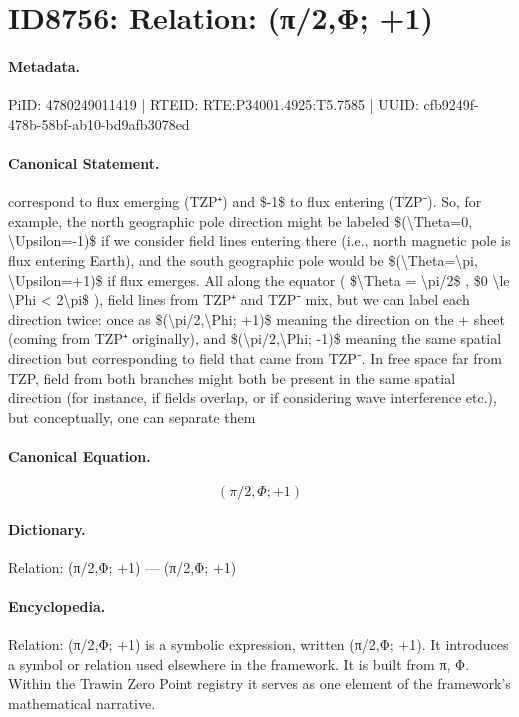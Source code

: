 \section*{ID8756: Relation: (π/2,Φ; +1)}
\paragraph{Metadata.}
PiID: 4780249011419 | RTEID: RTE:P34001.4925:T5.7585 | UUID: cfb9249f-478b-58bf-ab10-bd9afb3078ed

\paragraph{Canonical Statement.}
correspond to flux emerging (TZP⁺) and \$-1\$ to flux entering (TZP⁻). So, for example, the north geographic pole direction might be labeled \$(\textbackslash{}Theta=0, \textbackslash{}Upsilon=-1)\$ if we consider field lines entering there (i.e., north magnetic pole is flux entering Earth), and the south geographic pole would be \$(\textbackslash{}Theta=\textbackslash{}pi, \textbackslash{}Upsilon=+1)\$ if flux emerges. All along the equator ( \$\textbackslash{}Theta = \textbackslash{}pi/2\$ , \$0 \textbackslash{}le \textbackslash{}Phi < 2\textbackslash{}pi\$ ), field lines from TZP⁺ and TZP⁻ mix, but we can label each direction twice: once as \$(\textbackslash{}pi/2,\textbackslash{}Phi; +1)\$ meaning the direction on the + sheet (coming from TZP⁺ originally), and \$(\textbackslash{}pi/2,\textbackslash{}Phi; -1)\$ meaning the same spatial direction but corresponding to field that came from TZP⁻. In free space far from TZP, field from both branches might both be present in the same spatial direction (for instance, if fields overlap, or if considering wave interference etc.), but conceptually, one can separate them

\paragraph{Canonical Equation.}
\[
(\pi/2,\Phi; +1)
\]

\paragraph{Dictionary.}
Relation: (π/2,Φ; +1) — (π/2,Φ; +1)

\paragraph{Encyclopedia.}
Relation: (π/2,Φ; +1) is a symbolic expression, written (π/2,Φ; +1). It introduces a symbol or relation used elsewhere in the framework. It is built from π, Φ. Within the Trawin Zero Point registry it serves as one element of the framework's mathematical narrative.
